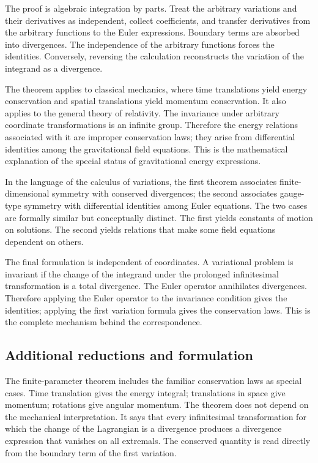 \documentclass[12pt]{article}
\begin{document}
The proof is algebraic integration by parts. Treat the arbitrary variations and their derivatives as
independent, collect coefficients, and transfer derivatives from the arbitrary functions to the
Euler expressions. Boundary terms are absorbed into divergences. The independence of the arbitrary
functions forces the identities. Conversely, reversing the calculation reconstructs the variation of
the integrand as a divergence.


The theorem applies to classical mechanics, where time translations yield energy conservation and
spatial translations yield momentum conservation. It also applies to the general theory of
relativity. The invariance under arbitrary coordinate transformations is an infinite group.
Therefore the energy relations associated with it are improper conservation laws; they arise from
differential identities among the gravitational field equations. This is the mathematical
explanation of the special status of gravitational energy expressions.


In the language of the calculus of variations, the first theorem associates finite-dimensional
symmetry with conserved divergences; the second associates gauge-type symmetry with differential
identities among Euler equations. The two cases are formally similar but conceptually distinct. The
first yields constants of motion on solutions. The second yields relations that make some field
equations dependent on others.


The final formulation is independent of coordinates. A variational problem is invariant if the
change of the integrand under the prolonged infinitesimal transformation is a total divergence. The
Euler operator annihilates divergences. Therefore applying the Euler operator to the invariance
condition gives the identities; applying the first variation formula gives the conservation laws.
This is the complete mechanism behind the correspondence.


\subsection{Additional reductions and formulation}

The finite-parameter theorem includes the familiar conservation laws as special cases. Time
translation gives the energy integral; translations in space give momentum; rotations give angular
momentum. The theorem does not depend on the mechanical interpretation. It says that every
infinitesimal transformation for which the change of the Lagrangian is a divergence produces a
divergence expression that vanishes on all extremals. The conserved quantity is read directly from
the boundary term of the first variation.
\end{document}
